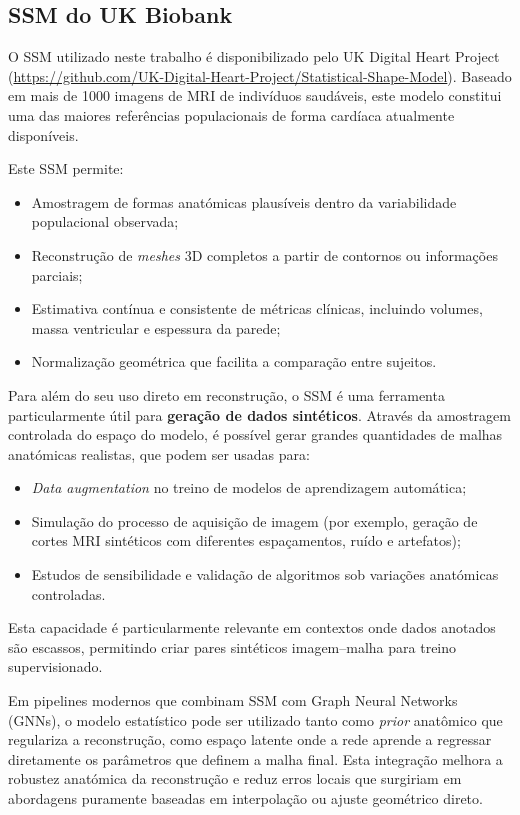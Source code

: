 \documentclass[12pt,a4paper]{report}
\begin{document}
\subsection*{SSM do UK Biobank}
O SSM utilizado neste trabalho é disponibilizado pelo UK Digital Heart Project (\url{https://github.com/UK-Digital-Heart-Project/Statistical-Shape-Model}). Baseado em mais de 1000 imagens de MRI de indivíduos saudáveis, este modelo constitui uma das maiores referências populacionais de forma cardíaca atualmente disponíveis. \parencite{bai-2015,demarvao2014}

Este SSM permite:
\begin{itemize}
    \item Amostragem de formas anatómicas plausíveis dentro da variabilidade populacional observada;
    \item Reconstrução de \textit{meshes} 3D completos a partir de contornos ou informações parciais;
    \item Estimativa contínua e consistente de métricas clínicas, incluindo volumes, massa ventricular e espessura da parede;
    \item Normalização geométrica que facilita a comparação entre sujeitos.
\end{itemize}

Para além do seu uso direto em reconstrução, o SSM é uma ferramenta particularmente útil para \textbf{geração de dados sintéticos}. Através da amostragem controlada do espaço do modelo, é possível gerar grandes quantidades de malhas anatómicas realistas, que podem ser usadas para:
\begin{itemize}
    \item \textit{Data augmentation} no treino de modelos de aprendizagem automática;
    \item Simulação do processo de aquisição de imagem (por exemplo, geração de cortes MRI sintéticos com diferentes espaçamentos, ruído e artefatos);
    \item Estudos de sensibilidade e validação de algoritmos sob variações anatómicas controladas.
\end{itemize}
Esta capacidade é particularmente relevante em contextos onde dados anotados são escassos, permitindo criar pares sintéticos imagem–malha para treino supervisionado. \parencite{bai-2015,zakeri-2022}

Em pipelines modernos que combinam SSM com Graph Neural Networks (GNNs), o modelo estatístico pode ser utilizado tanto como \textit{prior} anatômico que regulariza a reconstrução, como espaço latente onde a rede aprende a regressar diretamente os parâmetros que definem a malha final. Esta integração melhora a robustez anatómica da reconstrução e reduz erros locais que surgiriam em abordagens puramente baseadas em interpolação ou ajuste geométrico direto. \parencite{nakao2021,nakao2022,banerjee-2021,wijesinghe-2024}
\end{document}
